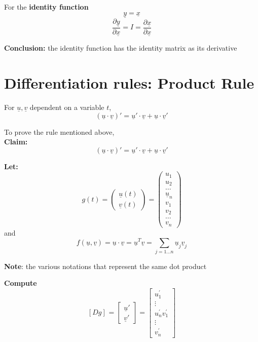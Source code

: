    For the \textbf{identity function} \[
     \underline{y} = \underline{x}
   \] 
   \[
     \frac{\partial \underline{y}}{\partial \underline{x} } = I = \frac{\partial \underline{x}}{\partial \underline{x}}
   \] 

   \textbf{Conclusion:} the identity function has the identity matrix as its derivative

   \section{Differentiation rules: Product Rule}

   \begin{framed}
      For $ \underline{u}, \underline{v}$ dependent on a variable $t$, 
      \[
         ( \underline{u} \cdot \underline{v})' = \underline{u}' \cdot \underline{v} + \underline{u} \cdot \underline{v}'
      \] 
   \end{framed}

   To prove the rule mentioned above, \\

   \textbf{Claim:}
      \[
         ( \underline{u} \cdot \underline{v})' = \underline{u}' \cdot \underline{v} + \underline{u} \cdot \underline{v}'
      \] 

   \textbf{Let:} 
   \[
     g(t) = \begin{pmatrix} \underline{u}(t) \\ \underline{v}(t) \end{pmatrix}  = \begin{pmatrix} 
     u_1 \\ u_2 \\ \hdots \\\underline{u}_n \\ v_1 \\ v_2 \\ \hdots \\ v_n
   \end{pmatrix} 
   \] 
   and
   \[
      f( \underline{u}, \underline{v}) = \underline{u} \cdot \underline{v} = \underline{u}^T \underline{v} = \sum_{j = 1 \hdots n} \underline{u}_j \underline{v}_j
   \] 

   \textbf{Note}: the various notations that represent the same dot product

   \textbf{Compute}
   \[
     \left[ D g \right]_{} = \begin{bmatrix} 
       \underline{u}' \\
       \underline{v}'
     \end{bmatrix} = \begin{bmatrix} 
       u_1 ^{\prime}   \\ \vdots \\
       u_n ^{\prime}  
       v_1 ^{\prime}   \\ \vdots \\
       v_n ^{\prime}  
     \end{bmatrix}
   \] 

